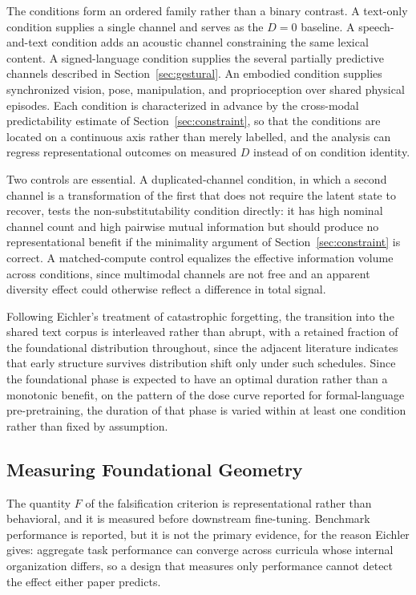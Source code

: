 \documentclass[11pt]{article}
\begin{document}
The conditions form an ordered family rather than a binary contrast. A text-only condition supplies a single channel and serves as the $D=0$ baseline. A speech-and-text condition adds an acoustic channel constraining the same lexical content. A signed-language condition supplies the several partially predictive channels described in Section~\ref{sec:gestural}. An embodied condition supplies synchronized vision, pose, manipulation, and proprioception over shared physical episodes. Each condition is characterized in advance by the cross-modal predictability estimate of Section~\ref{sec:constraint}, so that the conditions are located on a continuous axis rather than merely labelled, and the analysis can regress representational outcomes on measured $D$ instead of on condition identity.

Two controls are essential. A duplicated-channel condition, in which a second channel is a transformation of the first that does not require the latent state to recover, tests the non-substitutability condition directly: it has high nominal channel count and high pairwise mutual information but should produce no representational benefit if the minimality argument of Section~\ref{sec:constraint} is correct. A matched-compute control equalizes the effective information volume across conditions, since multimodal channels are not free and an apparent diversity effect could otherwise reflect a difference in total signal.

Following Eichler's treatment of catastrophic forgetting, the transition into the shared text corpus is interleaved rather than abrupt, with a retained fraction of the foundational distribution throughout, since the adjacent literature indicates that early structure survives distribution shift only under such schedules. Since the foundational phase is expected to have an optimal duration rather than a monotonic benefit, on the pattern of the dose curve reported for formal-language pre-pretraining, the duration of that phase is varied within at least one condition rather than fixed by assumption.

\subsection{Measuring Foundational Geometry}

The quantity $F$ of the falsification criterion is representational rather than behavioral, and it is measured before downstream fine-tuning. Benchmark performance is reported, but it is not the primary evidence, for the reason Eichler gives: aggregate task performance can converge across curricula whose internal organization differs, so a design that measures only performance cannot detect the effect either paper predicts.
\end{document}
